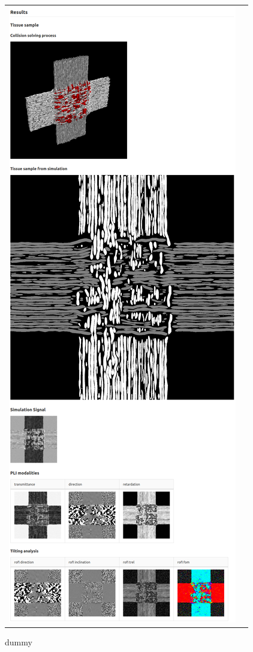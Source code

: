 \begin{figure}[!t]
{{\begin{tabular}{c|c}
 	\includegraphics[valign=T]{gfx/fastpli/fastpli_wiki_crossing_right.png} \\
    \end{tabular}
    }}
	\caption{dummy}
	\label{fig:fastpli_wiki_crossing}
\end{figure}
% 
% 

